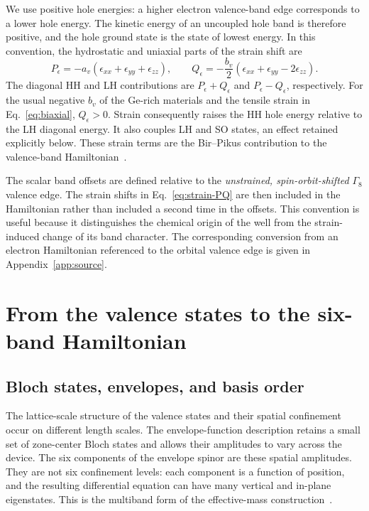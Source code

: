 \documentclass[10pt,letterpaper]{article}
\newcommand{\ep}{\epsilon}
\begin{document}
We use positive hole energies: a higher electron valence-band edge corresponds to a lower hole energy. The kinetic energy of an uncoupled hole band is therefore positive, and the hole ground state is the state of lowest energy. In this convention, the hydrostatic and uniaxial parts of the strain shift are
\begin{equation}
P_\ep=-a_v(\ep_ {xx}+\ep_ {yy}+\ep_ {zz}),\qquad
Q_\ep=-\frac{b_v}{2}(\ep_ {xx}+\ep_ {yy}-2\ep_ {zz}).
\label{eq:strain-PQ}
\end{equation}
The diagonal HH and LH contributions are $P_\ep+Q_\ep$ and $P_\ep-Q_\ep$, respectively. For the usual negative $b_v$ of the Ge-rich materials and the tensile strain in Eq.~\eqref{eq:biaxial}, $Q_\ep>0$. Strain consequently raises the HH hole energy relative to the LH diagonal energy. It also couples LH and SO states, an effect retained explicitly below. These strain terms are the Bir--Pikus contribution to the valence-band Hamiltonian~\cite{birpikus,winkler,delvecchio2026}.

The scalar band offsets are defined relative to the \emph{unstrained, spin-orbit-shifted} $\Gamma_8$ valence edge. The strain shifts in Eq.~\eqref{eq:strain-PQ} are then included in the Hamiltonian rather than included a second time in the offsets. This convention is useful because it distinguishes the chemical origin of the well from the strain-induced change of its band character. The corresponding conversion from an electron Hamiltonian referenced to the orbital valence edge is given in Appendix~\ref{app:source}.

\section{From the valence states to the six-band Hamiltonian}
\label{sec:sixband}

\subsection{Bloch states, envelopes, and basis order}

The lattice-scale structure of the valence states and their spatial confinement occur on different length scales. The envelope-function description retains a small set of zone-center Bloch states and allows their amplitudes to vary across the device. The six components of the envelope spinor are these spatial amplitudes. They are not six confinement levels: each component is a function of position, and the resulting differential equation can have many vertical and in-plane eigenstates. This is the multiband form of the effective-mass construction~\cite{luttingerkohn,winkler}.
\end{document}
